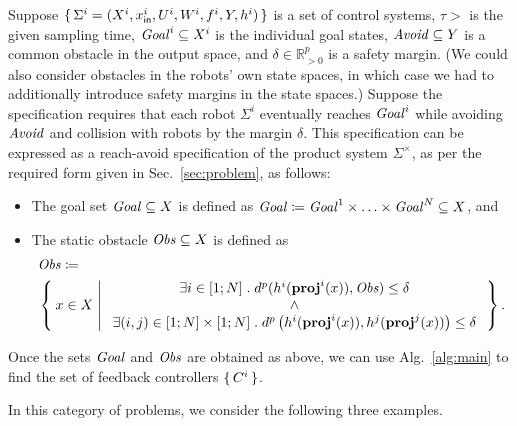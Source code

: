Suppose $\set{\Sigma^i=(X^i,x_{\mathsf{in}}^i,U^i,W^i,f^i,Y,h^i)}$ is a set of control systems, $\tau>$ is the given sampling time, $\mathit{Goal}^i\subseteq X^i$ is the individual goal states, $\mathit{Avoid}\subseteq Y$ is a common obstacle in the output space, and $\delta \in \mathbb{R}^p_{>0}$ is a safety margin.
(We could also consider obstacles in the robots' own state spaces, in which case we had to additionally introduce safety margins in the state spaces.)
Suppose the specification requires that each robot $\Sigma^i$ eventually reaches $\mathit{Goal}^i$ while avoiding $\mathit{Avoid}$ and collision with robots by the margin $\delta$.
This specification can be expressed as a reach-avoid specification of the product system $\Sigma^\times$, as per the required form given in Sec.~\ref{sec:problem}, as follows:
\begin{itemize}
	\item The goal set $\mathit{Goal}\subseteq X$ is defined as $\mathit{Goal} \coloneqq \mathit{Goal}^1\times \ldots \times \mathit{Goal}^N \subseteq X$, and
	\item The static obstacle $\mathit{Obs}\subseteq X$ is defined as 
		\begin{align}
			&\mathit{Obs} \coloneqq\\ 
				&\Set{ x\in X | 
					\begin{array}{c}
						\exists i\in [1;N]\;.\; d^{p}(h^i(\mathbf{proj}^i(x)),\mathit{Obs}) \leq \delta\\
						\wedge\\
						 \exists (i,j)\in [1;N]\times [1;N]\;.\; d^{p}\left(h^i(\mathbf{proj}^i(x)),h^j(\mathbf{proj}^j(x))\right)\leq\delta
					\end{array}}.
		\end{align}
\end{itemize}
Once the sets $\mathit{Goal}$ and $\mathit{Obs}$ are obtained as above, we can use Alg.~\ref{alg:main} to find the set of feedback controllers $\set{C^i}$.

In this category of problems, we consider the following three examples.

